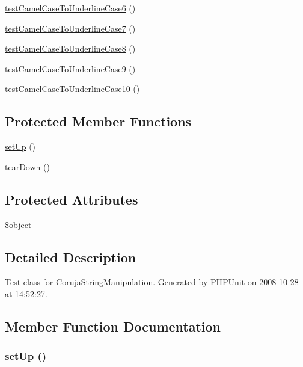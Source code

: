 \begin{CompactItemize}
\item 
\hyperlink{class_coruja_string_manipulation_test_25efbbc54e2501dc4fa6efa523bc5d4c}{testCamelCaseToUnderlineCase6} ()
\item 
\hyperlink{class_coruja_string_manipulation_test_adcd219254d8ac6b440f06411bcfb3c9}{testCamelCaseToUnderlineCase7} ()
\item 
\hyperlink{class_coruja_string_manipulation_test_bea69f550b604aa6e0e59393a80f73f7}{testCamelCaseToUnderlineCase8} ()
\item 
\hyperlink{class_coruja_string_manipulation_test_fd8d991d47ccc9df25b510d8ffaac893}{testCamelCaseToUnderlineCase9} ()
\item 
\hyperlink{class_coruja_string_manipulation_test_eb3cfc94f9036a82f22dbad35e4696e4}{testCamelCaseToUnderlineCase10} ()
\end{CompactItemize}
\subsection*{Protected Member Functions}
\begin{CompactItemize}
\item 
\hyperlink{class_coruja_string_manipulation_test_0bc688732d2b3b162ffebaf7812e78da}{setUp} ()
\item 
\hyperlink{class_coruja_string_manipulation_test_80fe3d17e658907fc75346a0ec9d6fc7}{tearDown} ()
\end{CompactItemize}
\subsection*{Protected Attributes}
\begin{CompactItemize}
\item 
\hyperlink{class_coruja_string_manipulation_test_52123b83a1952a68c5513e47d59ec4a6}{\$object}
\end{CompactItemize}


\subsection{Detailed Description}
Test class for \hyperlink{class_coruja_string_manipulation}{CorujaStringManipulation}. Generated by PHPUnit on 2008-10-28 at 14:52:27. 

\subsection{Member Function Documentation}
\hypertarget{class_coruja_string_manipulation_test_0bc688732d2b3b162ffebaf7812e78da}{
\subsubsection[{setUp}]{\setlength{\rightskip}{0pt plus 5cm}setUp ()}}
\label{class_coruja_string_manipulation_test_0bc688732d2b3b162ffebaf7812e78da}


